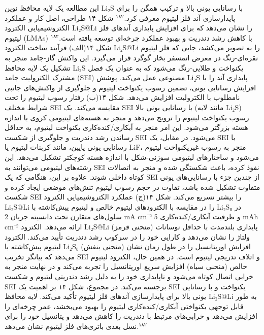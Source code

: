 \documentclass[12pt,a4paper,twocolumn]{article} %
\newcommand{\persian}[1]{\textfarsi{#1}}
\newcommand{\english}[1]{\textenglish{#1}}
\begin{document}
\persian{
این مطالعه یک لایه محافظ نوین \english{Li₂S} با رسانایی یونی بالا و ترکیب همگن را برای پایدارسازی آند فلز لیتیوم معرفی کرد.$^{۱۸۲}$ شکل ۱۴ طراحی، اصل کار و عملکرد الکتروشیمیایی الکترود \english{Li₂S@Li} را نشان می‌دهد که برای افزایش پایداری آندهای فلز لیتیوم (\english{LMAs}) با کاهش رشد دندریت و بهبود عملکرد چرخه‌ای توسعه یافته است.$^{۱۸۲}$ شکل ۱۴(الف) فرآیند ساخت الکترود \english{Li₂S@Li} را به تصویر می‌کشد، جایی که فلز لیتیوم نقره‌ای-رنگ در معرض اتمسفر بخار گوگرد قرار می‌گیرد. این واکنش گاز-جامد منجر به تشکیل یک لایه محافظ \english{Li₂S} یکنواخت و طلایی-رنگ می‌شود که به عنوان یک فصل مشترک الکترولیت جامد (\english{SEI}) مصنوعی عمل می‌کند. پوشش \english{Li₂S} پایداری آند را با افزایش رسانایی یونی، تضمین رسوب یکنواخت لیتیوم و جلوگیری از واکنش‌های جانبی نامطلوب با الکترولیت افزایش می‌دهد. شکل ۱۴(ب) رفتار رسوب لیتیوم را تحت شرایط مختلف \english{SEI} مقایسه می‌کند. یک \english{SEI} با رسانایی یونی بالا (مانند لایه \english{Li₂S}) رسوب یکنواخت لیتیوم را ترویج می‌دهد و منجر به هسته‌های لیتیومی کروی با اندازه هسته بزرگتر می‌شود. این امر منجر به آبکاری/کنده‌کاری یکنواخت لیتیوم، به حداقل رساندن رشد دندریت و جلوگیری از شکست \english{SEI} می‌شود. در مقابل، یک \english{SEI} با رسانایی یونی پایین، مانند کربنات لیتیوم یا \english{LiF}، منجر به رسوب غیریکنواخت لیتیوم می‌شود و ساختارهای لیتیومی سوزنی-شکل با اندازه هسته کوچکتر تشکیل می‌دهد. این رشته‌های لیتیومی می‌توانند به \english{SEI} نفوذ کرده، باعث شکستگی شده و منجر به اتصالات کوتاه داخلی شوند. علاوه بر این، هنگامی که یک \english{SEI} از چندین جزء با رسانایی‌های یونی متفاوت تشکیل شده باشد، تفاوت در حجم رسوب لیتیوم تنش‌های موضعی ایجاد کرده و شکست \english{SEI} را بیشتر تسریع می‌کند. شکل ۱۴(ج) عملکرد الکتروشیمیایی الکترود \english{Li₂S@Li} را در مقایسه با الکترودهای لیتیوم خالص و لیتیوم پیش‌کاشته با \english{Li₂S₈} در سلول‌های متقارن تحت دانسیته جریان \english{2 mA cm⁻²} و ظرفیت آبکاری/کنده‌کاری \english{5 mAh cm⁻²} ارائه می‌دهد. الکترود \english{Li₂S@Li} (منحنی قرمز) پایداری بلندمدت با حداقل نوسانات ولتاژ را نشان می‌دهد و کارایی خود را در سرکوب رشد دندریت تأیید می‌کند. الکترود لیتیوم پیش‌کاشته با \english{Li₂S₈} (منحنی بنفش) افزایش اورپتانسیل را در طول زمان نشان می‌دهد که بیانگر تخریب \english{SEI} و اتلاف تدریجی لیتیوم است. در همین حال، الکترود لیتیوم خالص (منحنی سیاه) افزایش سریع اورپتانسیل را تجربه می‌کند و در نهایت منجر به خرابی اتصال کوتاه می‌شود و ناپایداری خود را به دلیل رشد دندریتی لیتیوم و شکست \english{SEI} برجسته می‌کند. در مجموع، شکل ۱۴ بر اهمیت یک \english{SEI} یکنواخت و با رسانایی یونی بالا برای پایدارسازی آندهای فلز لیتیوم تأکید می‌کند. لایه محافظ \english{Li₂S@Li} به طور قابل توجهی یکنواختی آبکاری/کنده‌کاری لیتیوم را بهبود می‌بخشد، عمر چرخه‌ای را افزایش می‌دهد و خرابی‌های مرتبط با دندریت را کاهش می‌دهد و پتانسیل خود را برای نسل بعدی باتری‌های فلز لیتیوم نشان می‌دهد.$^{۱۸۲}$
}
\end{document}
